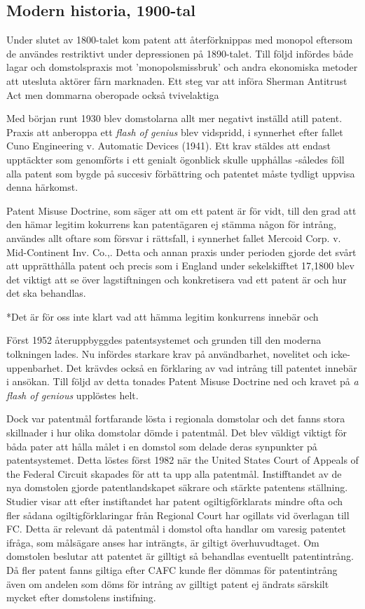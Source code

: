 \subsection{Modern historia, 1900-tal} 

Under slutet av 1800-talet kom patent att återförknippas med monopol eftersom de användes
restriktivt under depressionen  på 1890-talet. Till följd infördes både lagar och domstolspraxis mot 'monopolsmissbruk' och andra ekonomiska metoder att utesluta aktörer fårn marknaden. Ett steg var att införa Sherman Antitrust Act men dommarna oberopade också tvivelaktiga

 Med början runt 1930 blev domstolarna allt mer negativt inställd atill
patent. Praxis att anberoppa ett \emph{flash of genius} blev vidspridd, i synnerhet efter fallet Cuno
Engineering v. Automatic Devices (1941). Ett krav stäldes att endast upptäckter som genomförts i ett
genialt ögonblick skulle upphållas -således föll alla patent som bygde på succesiv förbättring och
patentet måste tydligt uppvisa denna härkomst\cite{nard}. 

Patent Misuse Doctrine, som säger att om ett patent är för vidt, till den grad att den hämar legitim
kokurrens kan patentägaren ej stämma någon för intrång, användes allt oftare som försvar i rättsfall, i
synnerhet fallet Mercoid Corp. v. Mid-Continent Inv. Co.,\cite{nard}. Detta och annan praxis under
perioden gjorde det svårt att upprätthålla patent och precis som i England under sekelskifftet 17,1800
blev det viktigt att se över lagstiftningen och konkretisera vad ett patent är och hur det ska behandlas.

*Det är för oss inte klart vad att hämma legitim konkurrens innebär och 

Först 1952 återuppbyggdes patentsystemet och grunden till den moderna tolkningen lades. Nu infördes
starkare krav på användbarhet, novelitet och icke-uppenbarhet. Det krävdes också en förklaring av vad
intrång till patentet innebär i ansökan. Till följd av detta tonades Patent Misuse Doctrine ned och
kravet på \emph{a flash of genious} upplöstes helt\cite{nard}.

Dock var patentmål fortfarande lösta i regionala domstolar och det fanns stora skillnader i hur olika
domstolar dömde i patentmål\cite{nard}. Det blev väldigt viktigt för båda pater att hålla målet i en
domstol som delade deras synpunkter på patentsystemet. Detta löstes först 1982 när the United States
Court of Appeals of the Federal Circuit skapades för att ta upp alla patentmål\cite{nard}. Instifftandet
av de nya domstolen gjorde patentlandskapet säkrare och stärkte patentens ställning. Studier visar att
efter instiftandet har patent ogiltigförklarats mindre ofta och fler sådana ogiltigförklaringar från
Regional Court har ogillats vid överlagan till FC. \cite{henry} Detta är relevant då patentmål i domstol
ofta handlar om varesig patentet ifråga, som målsägare anses har inträngts, är giltigt överhuvudtaget.
Om domstolen beslutar att patentet är gilltigt så behandlas eventuellt patentintrång. Då fler patent
fanns giltiga efter CAFC kunde fler dömmas för patentintrång även om andelen som döms för intrång av
gilltigt patent ej ändrats särskilt mycket efter domstolens instifning. 

